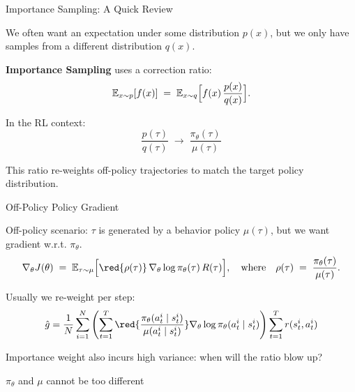 \documentclass[usenames,dvipsnames,notes,11pt,aspectratio=169,hyperref={colorlinks=true, linkcolor=blue}]{beamer}
\begin{document}
\begin{frame}{Importance Sampling: A Quick Review}
  \begin{wideitemize}
    \item We often want an expectation under some distribution $p(x)$,
    but we only have samples from a different distribution $q(x)$.
    \item \textbf{Importance Sampling} uses a correction ratio:
    \[
      \mathbb{E}_{x \sim p}[f(x)]
      \;=\;
      \mathbb{E}_{x \sim q}\Bigl[f(x)\,\frac{p(x)}{q(x)}\Bigr].
    \]
    \item In the RL context:
    \[
      \frac{p(\tau)}{q(\tau)}
      \;\rightarrow\;
      \frac{\pi_\theta(\tau)}{\mu(\tau)}
    \]
    \item This ratio re-weights off-policy trajectories to match the target policy distribution.
  \end{wideitemize}
\end{frame}
\begin{frame}{Off-Policy Policy Gradient}
  \begin{wideitemize}
    \item Off-policy scenario: $\tau$ is generated by a behavior policy $\mu(\tau)$, but we want gradient w.r.t. $\pi_\theta$.
    \[
      \nabla_\theta J(\theta)
      \;=\;
      \mathbb{E}_{\tau \sim \mu}\Bigl[
          \red{\rho(\tau)}
        \,\nabla_\theta \log \pi_\theta(\tau)
        \,R(\tau)
      \Bigr],
      \quad\text{where}\quad
      \rho(\tau)
      \;=\;
      \frac{\pi_\theta(\tau)}{\mu(\tau)}.
    \]
    \item Usually we re-weight per step:
    \[
            \hat{g} = \frac{1}{N}\sum_{i=1}^N
            \p{\sum_{t=1}^T 
            \red{\frac{\pi_\theta(a_t^i\mid s_t^i)}{\mu(a_t^i\mid s_t^i)}} 
            \nabla_\theta\log \pi_\theta(a_t^i\mid s_t^i)}
            \sum_{t=1}^Tr(s^i_t, a^i_t) 
    \]
   \item Importance weight also incurs high variance: when will the ratio blow up?
   \item $\pi_\theta$ and $\mu$ cannot be too different
  \end{wideitemize}
\end{frame}

\end{document}
